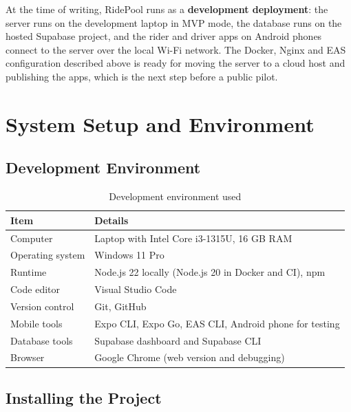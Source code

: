 At the time of writing, RidePool runs as a \textbf{development deployment}:
the server runs on the development laptop in MVP mode, the database runs on
the hosted Supabase project, and the rider and driver apps on Android phones
connect to the server over the local Wi-Fi network. The Docker, Nginx and EAS
configuration described above is ready for moving the server to a cloud host
and publishing the apps, which is the next step before a public pilot.

\section{System Setup and Environment}
\label{sec:setup}

\subsection{Development Environment}
\label{subsec:dev-environment}

\begin{table}[H]
  \centering
  \small
  \caption{Development environment used}
  \label{tab:dev-environment}
  \begin{tabularx}{\textwidth}{@{}p{3.4cm}L@{}}
    \toprule
    \textbf{Item} & \textbf{Details} \\
    \midrule
    Computer         & Laptop with Intel Core i3-1315U, 16 GB RAM \\
    Operating system & Windows 11 Pro \\
    Runtime          & Node.js 22 locally (Node.js 20 in Docker and CI), npm \\
    Code editor      & Visual Studio Code \\
    Version control  & Git, GitHub \\
    Mobile tools     & Expo CLI, Expo Go, EAS CLI, Android phone for testing \\
    Database tools   & Supabase dashboard and Supabase CLI \\
    Browser          & Google Chrome (web version and debugging) \\
    \bottomrule
  \end{tabularx}
\end{table}

\subsection{Installing the Project}
\label{subsec:install}

